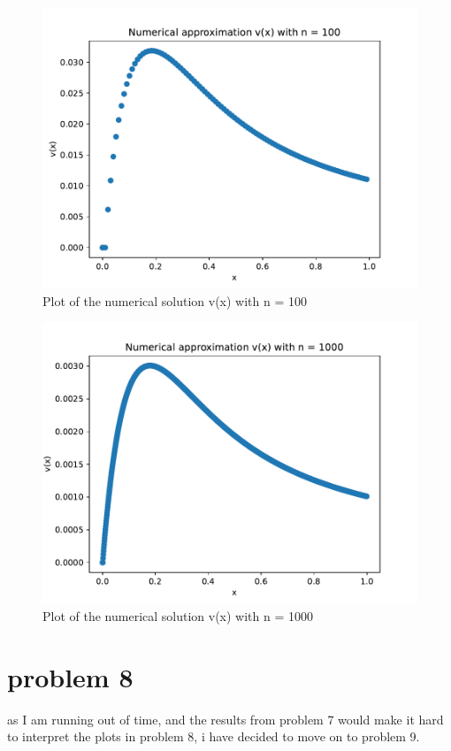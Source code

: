 \documentclass[english,notitlepage]{revtex4-1}
\begin{document}
	\begin{figure}[H]
		\centering
		\includegraphics[scale=0.55]{v2_plot.pdf}
		\caption{Plot of the numerical solution v(x) with n = 100}
		\label{fig:v2_plott}
	\end{figure}

	\begin{figure}[H]
		\centering
		\includegraphics[scale=0.55]{v3_plot.pdf}
		\caption{Plot of the numerical solution v(x) with n = 1000}
		\label{fig:v3_plott}
	\end{figure}

	\section*{problem 8}
	as I am running out of time, and the results from problem 7 would make it hard to interpret the plots in problem 8, i have decided to move on to problem 9.
	
\end{document}
